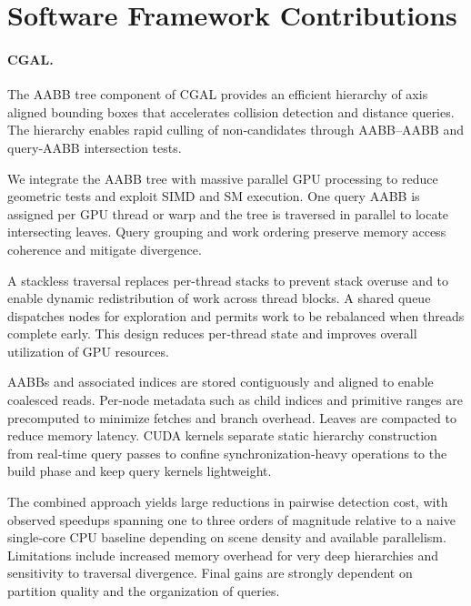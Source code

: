 \section{Software Framework Contributions}

\paragraph{CGAL.} The AABB tree component of CGAL provides an efficient hierarchy of axis aligned bounding boxes that accelerates collision detection and distance queries. The hierarchy enables rapid culling of non‑candidates through AABB–AABB and query‑AABB intersection tests.  

We integrate the AABB tree with massive parallel GPU processing to reduce geometric tests and exploit SIMD and SM execution. One query AABB is assigned per GPU thread or warp and the tree is traversed in parallel to locate intersecting leaves. Query grouping and work ordering preserve memory access coherence and mitigate divergence.  

A stackless traversal replaces per-thread stacks to prevent stack overuse and to enable dynamic redistribution of work across thread blocks. A shared queue dispatches nodes for exploration and permits work to be rebalanced when threads complete early. This design reduces per‑thread state and improves overall utilization of GPU resources.  

AABBs and associated indices are stored contiguously and aligned to enable coalesced reads. Per‑node metadata such as child indices and primitive ranges are precomputed to minimize fetches and branch overhead. Leaves are compacted to reduce memory latency. CUDA kernels separate static hierarchy construction from real‑time query passes to confine synchronization‑heavy operations to the build phase and keep query kernels lightweight.  

The combined approach yields large reductions in pairwise detection cost, with observed speedups spanning one to three orders of magnitude relative to a naive single‑core CPU baseline depending on scene density and available parallelism. Limitations include increased memory overhead for very deep hierarchies and sensitivity to traversal divergence. Final gains are strongly dependent on partition quality and the organization of queries.  

